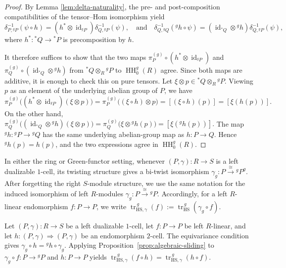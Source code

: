 \documentclass[11pt,oneside]{amsart}
\DeclareMathOperator{\HH}{HH}
\DeclareMathOperator{\id}{id}
\numberwithin{equation}{section}
\numberwithin{figure}{section}
\theoremstyle{plain}
\theoremstyle{definition}
\theoremstyle{remark}
\begin{document}
\begin{proof}
By Lemma \ref{lem:delta-naturality}, the pre- and post-composition compatibilities of the tensor--Hom isomorphism yield
\[
\delta_{P,{}^gP}^{-1}(\psi\circ h)
=
(h^*\otimes \id_{{}^gP})\delta_{Q,{}^gP}^{-1}(\psi), \quad
\text{and} \quad 
\delta_{Q,{}^gQ}^{-1}({}^gh\circ\psi)
=
(\id_{{}^*Q}\otimes{}^gh)\delta_{Q,{}^gP}^{-1}(\psi),
\]
where \(h^*:{}^*Q\to{}^*P\) is precomposition by \(h\).

It therefore suffices to show that the two maps
\(
\pi_P^{(g)}\circ(h^*\otimes \id_{{}^gP})\) and 
\(\pi_Q^{(g)}\circ(\id_{{}^*Q}\otimes{}^gh)
\)
from \({}^*Q\otimes_R{}^gP\) to \(\HH_0^g(R)\) agree. Since both maps are
additive, it is enough to check this on pure tensors. Let
\(\xi\otimes p\in{}^*Q\otimes_R{}^gP\). Viewing \(p\) as an element of the
underlying abelian group of \(P\), we have
\[
\pi_P^{(g)}\bigl((h^*\otimes\id_{{}^gP})(\xi\otimes p)\bigr)
=
\pi_P^{(g)}\bigl((\xi\circ h)\otimes p\bigr)
=
[(\xi\circ h)(p)]
=
[\xi(h(p))].
\]
On the other hand,
\(
\pi_Q^{(g)}\bigl((\id_{{}^*Q}\otimes{}^gh)(\xi\otimes p)\bigr)
=
\pi_Q^{(g)}\bigl(\xi\otimes{}^gh(p)\bigr)
=
[\xi({}^gh(p))].
\)
The map \({}^gh:{}^gP\to{}^gQ\) has the same underlying
abelian-group map as \(h:P\to Q\). Hence
\({}^gh(p)=h(p)\), and the two expressions agree in
\(\HH_0^g(R)\).
\end{proof}

\begin{remark}
In either the ring or Green-functor setting, whenever
\((P,\gamma)\colon R\to S\) is a left dualizable \(1\)-cell, its
twisting structure gives a bi-twist isomorphism
\(\gamma_g\colon P\xrightarrow{\cong}{}^gP^g\).
After forgetting the right \(S\)-module structure, we use the same
notation for the induced isomorphism of left \(R\)-modules
\(\gamma_g\colon P\xrightarrow{\cong}{}^gP\).
Accordingly, for a left \(R\)-linear endomorphism \(f\colon P\to P\),
we write
\(\operatorname{tr}_{\mathrm{HS},\gamma}^{\,g}(f)
:=
\operatorname{tr}_{\mathrm{HS}}^{\,g}(\gamma_g\circ f)\).
\end{remark}

Let \((P,\gamma)\colon R\to S\) be a left dualizable \(1\)-cell,
let \(f\colon P\to P\) be left \(R\)-linear, and let
\(h\colon(P,\gamma)\Rightarrow(P,\gamma)\) be an endomorphism
\(2\)-cell. The equivariance condition gives
\(\gamma_g\circ h={}^gh\circ\gamma_g\).
Applying Proposition~\ref{prop:algebraic-sliding} to
\(\gamma_g\circ f\colon P\to{}^gP\) and \(h\colon P\to P\) yields
\(
\operatorname{tr}_{\mathrm{HS},\gamma}^{\,g}(f\circ h)
=
\operatorname{tr}_{\mathrm{HS},\gamma}^{\,g}(h\circ f).
\)
\end{document}
